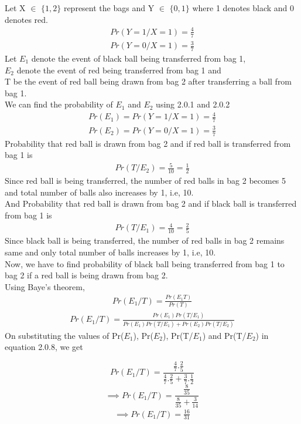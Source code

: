 \documentclass[journal,12pt,twocolumn]{IEEEtran}
\begin{document}
Let X $\in$ $ \{1,2\} $ represent the bags and Y $\in$ $\{0,1\}$ where 1 denotes black and 0 denotes red.\\
\begin{align}
    Pr(Y=1/X=1)=\frac{4}{7}\\
    Pr(Y=0/X=1)=\frac{3}{7}
\end{align}
Let $E_1$ denote the event of black ball being transferred from bag 1,\\ $E_2$ denote the event of red being transferred from bag 1 and\\ T be the event of red ball being drawn from bag 2 after transferring a ball from bag 1.\\
We can find the probability of $E_1$ and $E_2$ using 2.0.1 and 2.0.2
\begin{align}
    Pr(E_1)=Pr(Y=1/X=1)=\frac{4}{7}\\
    Pr(E_2)=Pr(Y=0/X=1)=\frac{3}{7}
\end{align}
Probability that red ball is drawn from bag 2 and if red ball is transferred from bag 1 is
\begin{align}
    Pr(T/E_2)=\frac{5}{10}=\frac{1}{2}
\end{align}
Since red ball is being transferred, the number of red balls in bag 2 becomes 5 and total number of balls also increases by 1, i.e, 10.\\
And Probability that red ball is drawn from bag 2 and if black ball is transferred from bag 1 is
\begin{align}
    Pr(T/E_1)=\frac{4}{10}=\frac{2}{5}
\end{align}
Since black ball is being transferred, the number of red balls in bag 2 remains same and only total number of balls increases by 1, i.e, 10.\\

Now, we have to find probability of black ball being transferred from bag 1 to bag 2 if a red ball is being drawn from bag 2.\\
Using Baye's theorem,
\begin{align}
    Pr(E_1/T)=\frac{Pr(E_1T)}{Pr(T)}
\end{align}
\begin{align}
    Pr(E_1/T)=\frac{Pr(E_1)Pr(T/E_1)}{Pr(E_1)Pr(T/E_1)+Pr(E_2)Pr(T/E_2)}
\end{align}
On substituting the values of Pr($E_1$), Pr($E_2$), Pr(T/$E_1$) and Pr(T/$E_2$) in equation 2.0.8, we get

    \[Pr(E_1/T)=\frac{\frac{4}{7}.\frac{2}{5}}{\frac{4}{7}.\frac{2}{5}+\frac{3}{7}.\frac{1}{2}}\]
    \[\implies Pr(E_1/T)=\frac{\frac{8}{35}}{\frac{8}{35}+\frac{3}{14}}\]
    \begin{align}
        \implies Pr(E_1/T)=\frac{16}{31}
    \end{align}
    
\end{document}

